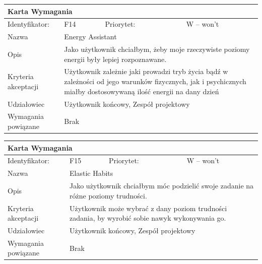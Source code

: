 \documentclass[a4paper,11pt]{report}
\begin{document}
		\vspace*{0,2 cm}
		\newline
		\begin{tabular}{|p{3cm}|p{2cm}|p{2cm}|p{6cm}|}
		\hline
		\multicolumn{4}{|p{12 cm}|}{Karta Wymagania}\\
		\hline
		Identyfikator: & F14 & Priorytet: & W – won't\\
		\hline
		Nazwa & \multicolumn{3}{|p{10 cm}|}{Energy Assistant}\\
		\hline
		Opis & \multicolumn{3}{|p{10 cm}|}{Jako użytkownik chciałbym, żeby moje rzeczywiste poziomy energii były lepiej rozpoznawane.}\\
		\hline
		Kryteria akceptacji & \multicolumn{3}{|p{10 cm}|}{Użytkownik zależnie jaki prowadzi tryb życia bądź w zależności od jego warunków fizycznych, jak i psychicznych miałby dostosowywaną ilość energii na dany dzień}\\
		\hline
		Udziałowiec & \multicolumn{3}{|p{10 cm}|}{Użytkownik końcowy, Zespół projektowy}\\
		\hline
		Wymagania powiązane & \multicolumn{3}{|p{10 cm}|}{Brak}\\
		\hline
		\end{tabular}
		\newline
		\vspace*{0,2 cm}
		\newline
		\begin{tabular}{|p{3cm}|p{2cm}|p{2cm}|p{6cm}|}
		\hline
		\multicolumn{4}{|p{12 cm}|}{Karta Wymagania}\\
		\hline
		Identyfikator: & F15 & Priorytet: & W – won't\\
		\hline
		Nazwa & \multicolumn{3}{|p{10 cm}|}{Elastic Habits}\\
		\hline
		Opis & \multicolumn{3}{|p{10 cm}|}{Jako użytkownik chciałbym móc podzielić swoje zadanie na różne poziomy trudności.}\\
		\hline
		Kryteria akceptacji & \multicolumn{3}{|p{10 cm}|}{Użytkownik może wybrać z dany poziom trudności zadania, by wyrobić sobie nawyk wykonywania go.}\\
		\hline
		Udziałowiec & \multicolumn{3}{|p{10 cm}|}{Użytkownik końcowy, Zespół projektowy}\\
		\hline
		Wymagania powiązane & \multicolumn{3}{|p{10 cm}|}{Brak}\\
		\hline
		\end{tabular}\\
\end{document}
